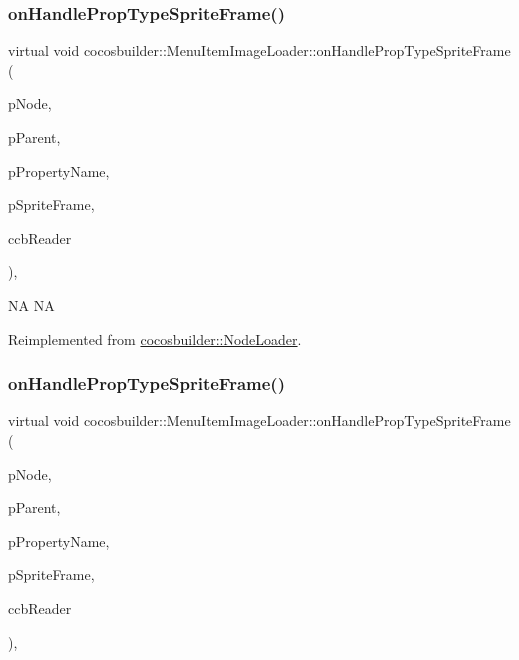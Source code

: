 \subsubsection{\texorpdfstring{on\+Handle\+Prop\+Type\+Sprite\+Frame()}{onHandlePropTypeSpriteFrame()}\hspace{0.1cm}{\footnotesize\ttfamily [1/2]}}
{\footnotesize\ttfamily virtual void cocosbuilder\+::\+Menu\+Item\+Image\+Loader\+::on\+Handle\+Prop\+Type\+Sprite\+Frame (\begin{DoxyParamCaption}\item[{cocos2d\+::\+Node $\ast$}]{p\+Node,  }\item[{cocos2d\+::\+Node $\ast$}]{p\+Parent,  }\item[{const char $\ast$}]{p\+Property\+Name,  }\item[{cocos2d\+::\+Sprite\+Frame $\ast$}]{p\+Sprite\+Frame,  }\item[{\hyperlink{classcocosbuilder_1_1CCBReader}{C\+C\+B\+Reader} $\ast$}]{ccb\+Reader }\end{DoxyParamCaption})\hspace{0.3cm}{\ttfamily [protected]}, {\ttfamily [virtual]}}

NA  NA 

Reimplemented from \hyperlink{classcocosbuilder_1_1NodeLoader}{cocosbuilder\+::\+Node\+Loader}.

\mbox{\label{classcocosbuilder_1_1MenuItemImageLoader_a7d3980370200bf7299357dec8fb8b701}} 
\subsubsection{\texorpdfstring{on\+Handle\+Prop\+Type\+Sprite\+Frame()}{onHandlePropTypeSpriteFrame()}\hspace{0.1cm}{\footnotesize\ttfamily [2/2]}}
{\footnotesize\ttfamily virtual void cocosbuilder\+::\+Menu\+Item\+Image\+Loader\+::on\+Handle\+Prop\+Type\+Sprite\+Frame (\begin{DoxyParamCaption}\item[{cocos2d\+::\+Node $\ast$}]{p\+Node,  }\item[{cocos2d\+::\+Node $\ast$}]{p\+Parent,  }\item[{const char $\ast$}]{p\+Property\+Name,  }\item[{cocos2d\+::\+Sprite\+Frame $\ast$}]{p\+Sprite\+Frame,  }\item[{\hyperlink{classcocosbuilder_1_1CCBReader}{C\+C\+B\+Reader} $\ast$}]{ccb\+Reader }\end{DoxyParamCaption})\hspace{0.3cm}{\ttfamily [protected]}, {\ttfamily [virtual]}}

